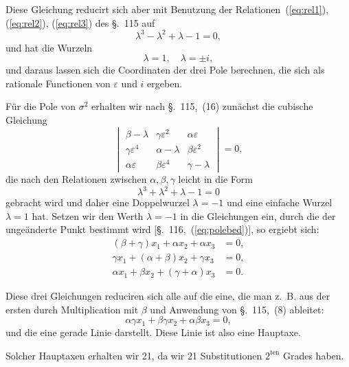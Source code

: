 \documentclass[12pt,a4paper]{article}
\begin{document}
Diese Gleichung reducirt sich aber mit Benutzung der Relationen~(\ref{eq:rel1}), (\ref{eq:rel2}), (\ref{eq:rel3}) des \S.~115 auf
\begin{equation}
\label{eq:hauptax3} \lambda^3 - \lambda^2 + \lambda - 1 = 0,
\end{equation}
und hat die Wurzeln
\[\lambda = 1, \quad \lambda = \pm i,\]
und daraus lassen sich die Coordinaten der drei Pole berechnen, die sich als rationale Functionen von $\varepsilon$ und $i$ ergeben.

F\"ur die Pole von $\sigma^2$ erhalten wir nach \S.~115,~(16) zun\"achst die cubische Gleichung
\[\begin{vmatrix} \beta - \lambda & \gamma\varepsilon^2 & \alpha\varepsilon \\ \gamma\varepsilon^4 & \alpha - \lambda & \beta\varepsilon^2 \\ \alpha\varepsilon & \beta\varepsilon^4 & \gamma - \lambda \end{vmatrix} = 0,\]
die nach den Relationen zwischen $\alpha, \beta, \gamma$ leicht in die Form
\begin{equation}
\label{eq:hauptax4} \lambda^3 + \lambda^2 + \lambda - 1 = 0
\end{equation}
gebracht wird und daher eine Doppelwurzel $\lambda = -1$ und eine einfache Wurzel $\lambda = 1$ hat. Setzen wir den Werth $\lambda = -1$ in die Gleichungen ein, durch die der unge\"anderte Punkt bestimmt wird [\S.~116,~(\ref{eq:polebed})], so ergiebt sich:
\begin{align*}
(\beta + \gamma)x_1 + \alpha x_2 + \alpha x_3 &= 0,\\
\gamma x_1 + (\alpha + \beta)x_2 + \gamma x_3 &= 0,\\
\alpha x_1 + \beta x_2 + (\gamma + \alpha)x_3 &= 0.
\end{align*}

Diese drei Gleichungen reduciren sich alle auf die eine, die man z.~B. aus der ersten durch Multiplication mit $\beta$ und Anwendung von \S.~115,~(8) ableitet:
\begin{equation}
\label{eq:hauptax5} \alpha\gamma x_1 + \beta\gamma x_2 + \alpha\beta x_3 = 0,
\end{equation}
und die eine gerade Linie darstellt. Diese Linie ist also eine Hauptaxe.

Solcher Hauptaxen erhalten wir 21, da wir 21 Substitutionen $2^{\text{ten}}$ Grades haben.
\end{document}
